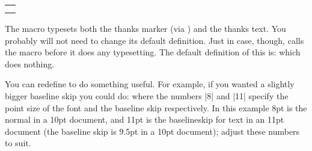 \documentclass[10pt,letterpaper]{memoir}
\makeatletter
\def\cmd#1{\cs{\expandafter\cmd@to@cs\string#1}}
\def\cmd@to@cs#1#2{\char\number`#2\relax}
\DeclareRobustCommand{\cs}[1]{\texttt{\char`\\#1}}
\newcommand*{\cmdprint}[1]{\texttt{\string#1}}
\def\cmd#1{\cmdprint{#1}%
  \index{\expandafter\@gobble\string#1?\string\cmdprint{\string#1}}}
\newcommand{\@zeroseps}{\setlength{\topsep}{\z@}
                        \setlength{\partopsep}{\z@}
                        \setlength{\parskip}{\z@}}
\newlength{\gparindent} \setlength{\gparindent}{\parindent}
\newenvironment{lcode}{\@zeroseps
  \renewcommand{\verbatim@startline}{\verbatim@line{\hskip\gparindent}}
  \small\setlength{\baselineskip}{\onelineskip}\verbatim}%
  {\endverbatim
   \vspace{-\baselineskip}%
   \noindent
}
\newenvironment{syntax}{\begin{center}
                        \begin{tabular}{|p{0.9\linewidth}|} \hline}%
                       {\hline
                        \end{tabular}
                        \end{center}}
\makeatother
\begin{document}
\begin{lcode}
\begin{comment}
\item Setting |\thanksfootextra{ }| and |\thanksscript{#1}| 
      right justifies the baseline mark and a space in the mark box:
   \begin{itemize}
   \item The normal style is
         defined by |\thanksmarkwidth{1.8em}| and \\
         |\thanksmargin{-\thanksmarkwidth}| which put the mark 
         indented and the text left adjusted, like a normal indented
         paragraph\index{paragraph!indentation}.
   \item |\thanksmarkwidth{1.8em}| and
         |\thanksmargin{0em}| put the mark indented 
         and the text indented and aligned.
   \end{itemize}

\end{itemize}

\end{comment}

\begin{syntax}
\cmd{\makethanksmark} \\
\cmd{\makethanksmarkhook} \\
\end{syntax}
The macro \cmd{\makethanksmark} typesets both the thanks marker (via
\cmd{\thanksfootmark}) and the thanks text. You probably will not need
to change its default definition. Just in case, though, 
\cmd{\makethanksmark}
calls the macro \cmd{\makethanksmarkhook} before it does any typesetting.
The default definition of this is: 
\begin{lcode}
\newcommand{\makethanksmarkhook}{}
\end{lcode}
which does nothing.

   You can redefine \cmd{\makethanksmarkhook} to do something useful. For
example, if you wanted a slightly bigger baseline skip you could do:
\begin{lcode}
\renewcommand{\makethanksmarkhook}{\fontsize{8}{11}\selectfont}
\end{lcode}
where the numbers |8| and |11| specify the point size of the font 
and the baseline skip
respectively. In this example 8pt is the normal \cmd{\footnotesize} in
a 10pt document, and 11pt is the baselineskip for \cmd{\footnotesize}
text in an 11pt document (the baseline skip is 9.5pt in a 10pt document); 
adjust these numbers to suit.


\end{lcode}
\end{document}
